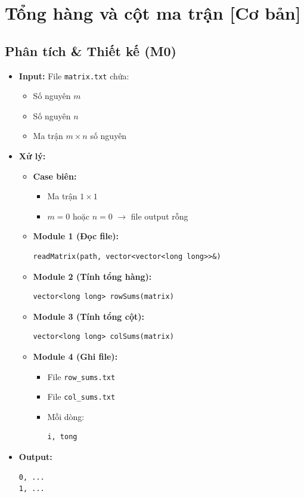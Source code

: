 \section{Tổng hàng và cột ma trận [Cơ bản]}
\subsection{Phân tích \& Thiết kế (M0)}

\begin{itemize}
    \item \textbf{Input:}  
    File \texttt{matrix.txt} chứa:
    \begin{itemize}
        \item Số nguyên $m$
        \item Số nguyên $n$
        \item Ma trận $m \times n$ số nguyên
    \end{itemize}

    \item \textbf{Xử lý:}
    \begin{itemize}
        \item \textbf{Case biên:}
        \begin{itemize}
            \item Ma trận $1 \times 1$
            \item $m=0$ hoặc $n=0$ $\rightarrow$ file output rỗng
        \end{itemize}

        \item \textbf{Module 1 (Đọc file):}
\begin{lstlisting}
readMatrix(path, vector<vector<long long>>&)
\end{lstlisting}

        \item \textbf{Module 2 (Tính tổng hàng):}
\begin{lstlisting}
vector<long long> rowSums(matrix)
\end{lstlisting}

        \item \textbf{Module 3 (Tính tổng cột):}
\begin{lstlisting}
vector<long long> colSums(matrix)
\end{lstlisting}

        \item \textbf{Module 4 (Ghi file):}
        \begin{itemize}
            \item File \texttt{row\_sums.txt}
            \item File \texttt{col\_sums.txt}
            \item Mỗi dòng:
\begin{lstlisting}
i, tong
\end{lstlisting}
        \end{itemize}
    \end{itemize}

    \item \textbf{Output:}
\begin{lstlisting}
0, ...
1, ...
\end{lstlisting}
\end{itemize}

